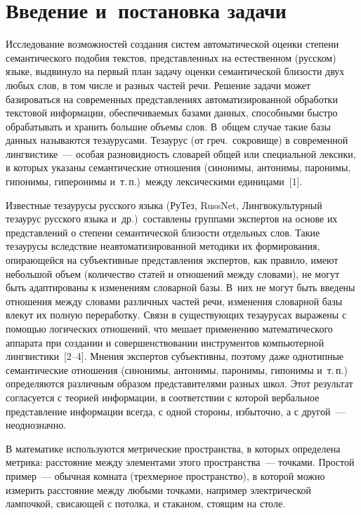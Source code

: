       \begin{multicols}{2}

            \label{st\stat}

\section{Введение и~постановка задачи}
     
     Исследование возможностей создания систем автоматической оценки 
степени семантического подобия текстов, представленных на естественном 
(русском) языке, выдвинуло на первый план задачу оценки семантической 
близости двух любых слов, в том числе и разных частей речи. Решение задачи 
может базироваться на современных представлениях автоматизированной 
обработки текстовой информации, обеспечиваемых базами данных, 
способными быстро обрабатывать и хранить большие объемы слов. В~общем 
случае такие базы данных называются тезаурусами. Тезаурус (от греч.\ 
сокровище) в современной лингвистике~--- особая разновидность словарей 
общей или специальной лексики, в которых указаны семантические отношения 
(синонимы, антонимы, паронимы, гипонимы, гиперонимы и~т.\,п.)\ между 
лексическими единицами~[1]. 
    {
    
    }
     
     Известные тезаурусы русского языка (РуТез, RussNet, Лингвокультурный 
тезаурус русского языка и~др.)\ со\-став\-ле\-ны группами экспертов на основе 
их представлений о степени семантической бли\-зости отдельных слов. Такие 
тезаурусы вследствие неавтоматизированной методики их формирования, 
опирающейся на субъективные представления экспертов, как правило, имеют 
небольшой объем (количество статей и отношений между словами), не могут 
быть адаптированы к изменениям словарной базы. В~них не могут быть 
введены отношения между словами различных частей речи, изменения 
словарной базы влекут их полную переработку. Связи в существующих 
тезаурусах выражены с помощью логических отношений, что мешает 
применению математического аппарата при создании и совершенствовании 
инструментов компьютерной лингвистики~[2--4]. Мнения экспертов 
субъективны, поэтому даже однотипные семантические отношения (синонимы, 
антонимы, паронимы, гипонимы и~т.\,п.) определяются различным образом 
представителями разных школ. Этот результат согласуется с теорией 
информации, в соответствии с которой вербальное представление информации 
всегда, с одной стороны, избыточно, а с другой~--- неоднозначно. 
     
     В математике используются метрические пространства, в которых 
определена метрика: расстояние между элементами этого пространства~--- 
точками. Простой пример~--- обычная комната (трехмерное пространство), в 
которой можно измерить расстояние между любыми точками, например 
электрической лампочкой, свисающей с потолка, и стаканом, стоящим на столе. 
     

\end{multicols}
